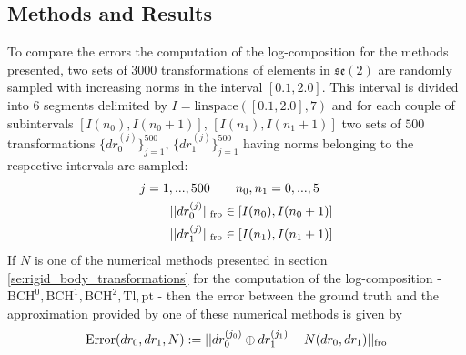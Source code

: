 \subsection{Methods and Results}

To compare the errors the computation of the log-composition for the methods presented, two sets of $3000$ transformations of elements in $\mathfrak{se}(2)$ are randomly sampled with increasing norms in the interval $[0.1, 2.0]$. This interval is divided into 6 segments delimited by $ I = \text{linspace}([0.1, 2.0], 7)$ and for each couple of subintervals $[I(n_0), I(n_0+1)]$, $[I(n_1), I(n_1+1)]$ two sets of $500$ transformations $\{ dr_{0}^{(j)}\}_{j=1}^{500}$, $\{ dr_{1}^{(j)} \}_{j=1}^{500}$ having norms belonging to the respective intervals are sampled:
\begin{align*}
j=1,...,500 \quad &\quad  n_0, n_1 = 0,...,5 \\
\vert\lvert dr_{0}^{(j)} \rvert\vert_{\text{fro}} &\in [I(n_0), I(n_0+1)] \\
\vert\lvert dr_{1}^{(j)} \rvert\vert_{\text{fro}} &\in [I(n_1), I(n_1+1)]  
\end{align*} 
If $N$ is one of the numerical methods presented in section \ref{se:rigid_body_transformations} for the computation of the log-composition - $\text{BCH}^{0}, \text{BCH}^{1}, \text{BCH}^{2}, \text{Tl}, \text{pt}$ - 
then the error between the ground truth and the approximation provided by one of these numerical methods is given by
\begin{align*}
\text{Error}(dr_{0},dr_{1},N) 
:= 
\vert\lvert dr_{0}^{(j_0)} \oplus dr_{1}^{(j_1)} 
- 
N(dr_{0}, dr_{1})  \rvert\vert_{\text{fro}} 
\end{align*}

